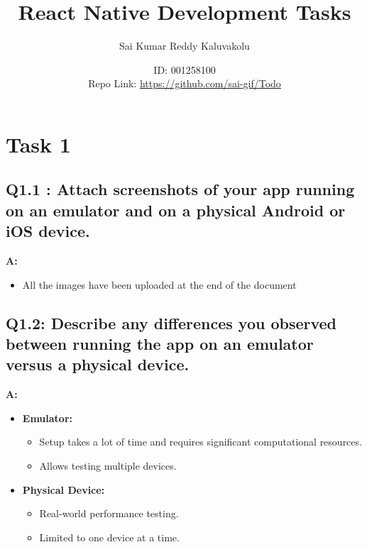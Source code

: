 \documentclass{article}
\title{\textbf{React Native Development Tasks}}
\author{Sai Kumar Reddy Kaluvakolu}
\date{ID: 001258100 \\ Repo Link: \href{https://github.com/sai-gif/Todo}{https://github.com/sai-gif/Todo}}
\begin{document}
\maketitle

\section*{Task 1}

\subsection*{Q1.1 : Attach screenshots of your app running on an emulator and on a physical Android
 or iOS device.}

 \textbf{A:}
    \begin{itemize}
        \item All the images have been uploaded at the end of the document
    \end{itemize}





\subsection*{Q1.2: Describe any differences you observed between running the app on an emulator versus a physical device.}
\textbf{A:}
\begin{itemize}
    \item \textbf{Emulator:}
    \begin{itemize}
        \item Setup takes a lot of time and requires significant computational resources.
        \item Allows testing multiple devices.
    \end{itemize}
    \item \textbf{Physical Device:}
    \begin{itemize}
        \item Real-world performance testing.
        \item Limited to one device at a time.
    \end{itemize}
\end{itemize}
\end{document}

